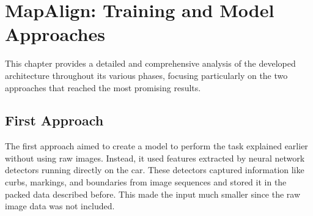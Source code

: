 \NoBgThispage
\chapter{MapAlign: Training and Model Approaches}

This chapter provides a detailed and comprehensive analysis of the developed architecture throughout its various phases, focusing particularly on the two approaches that reached the most promising results.

\section{First Approach}

The first approach aimed to create a model to perform the task explained earlier without using raw images. Instead, it used features extracted by neural network detectors running directly on the car. These detectors captured information like curbs, markings, and boundaries from image sequences and stored it in the packed data described before. This made the input much smaller since the raw image data was not included.

